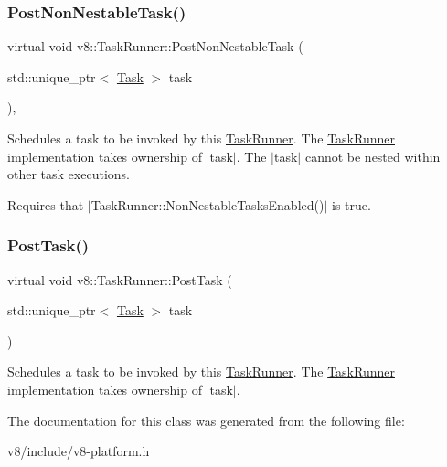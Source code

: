 \subsubsection{\texorpdfstring{Post\+Non\+Nestable\+Task()}{PostNonNestableTask()}}
{\footnotesize\ttfamily virtual void v8\+::\+Task\+Runner\+::\+Post\+Non\+Nestable\+Task (\begin{DoxyParamCaption}\item[{std\+::unique\+\_\+ptr$<$ \mbox{\hyperlink{classv8_1_1Task}{Task}} $>$}]{task }\end{DoxyParamCaption})\hspace{0.3cm}{\ttfamily [inline]}, {\ttfamily [virtual]}}

Schedules a task to be invoked by this \mbox{\hyperlink{classv8_1_1TaskRunner}{Task\+Runner}}. The \mbox{\hyperlink{classv8_1_1TaskRunner}{Task\+Runner}} implementation takes ownership of $\vert$task$\vert$. The $\vert$task$\vert$ cannot be nested within other task executions.

Requires that $\vert$\+Task\+Runner\+::\+Non\+Nestable\+Tasks\+Enabled()$\vert$ is true. \mbox{\label{classv8_1_1TaskRunner_a755795cc77383daf067a17673569c685}} 
\subsubsection{\texorpdfstring{Post\+Task()}{PostTask()}}
{\footnotesize\ttfamily virtual void v8\+::\+Task\+Runner\+::\+Post\+Task (\begin{DoxyParamCaption}\item[{std\+::unique\+\_\+ptr$<$ \mbox{\hyperlink{classv8_1_1Task}{Task}} $>$}]{task }\end{DoxyParamCaption})\hspace{0.3cm}{\ttfamily [pure virtual]}}

Schedules a task to be invoked by this \mbox{\hyperlink{classv8_1_1TaskRunner}{Task\+Runner}}. The \mbox{\hyperlink{classv8_1_1TaskRunner}{Task\+Runner}} implementation takes ownership of $\vert$task$\vert$. 

The documentation for this class was generated from the following file\+:\begin{DoxyCompactItemize}
\item 
v8/include/v8-\/platform.\+h\end{DoxyCompactItemize}
